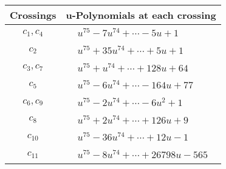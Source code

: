 \documentclass[1p]{elsarticle_modified}
\theoremstyle{definition}
\begin{document}
\begin{tabular}{m{50pt}|m{274pt}}
Crossings & \hspace{64pt}u-Polynomials at each crossing \\
\hline $$\begin{aligned}c_{1},c_{4}\end{aligned}$$&$\begin{aligned}
&u^{75}-7 u^{74}+\cdots-5 u+1
\end{aligned}$\\
\hline $$\begin{aligned}c_{2}\end{aligned}$$&$\begin{aligned}
&u^{75}+35 u^{74}+\cdots+5 u+1
\end{aligned}$\\
\hline $$\begin{aligned}c_{3},c_{7}\end{aligned}$$&$\begin{aligned}
&u^{75}+u^{74}+\cdots+128 u+64
\end{aligned}$\\
\hline $$\begin{aligned}c_{5}\end{aligned}$$&$\begin{aligned}
&u^{75}-6 u^{74}+\cdots-164 u+77
\end{aligned}$\\
\hline $$\begin{aligned}c_{6},c_{9}\end{aligned}$$&$\begin{aligned}
&u^{75}-2 u^{74}+\cdots-6 u^2+1
\end{aligned}$\\
\hline $$\begin{aligned}c_{8}\end{aligned}$$&$\begin{aligned}
&u^{75}+2 u^{74}+\cdots+126 u+9
\end{aligned}$\\
\hline $$\begin{aligned}c_{10}\end{aligned}$$&$\begin{aligned}
&u^{75}-36 u^{74}+\cdots+12 u-1
\end{aligned}$\\
\hline $$\begin{aligned}c_{11}\end{aligned}$$&$\begin{aligned}
&u^{75}-8 u^{74}+\cdots+26798 u-565
\end{aligned}$\\
\hline
\end{tabular}\\~\\
\end{document}
